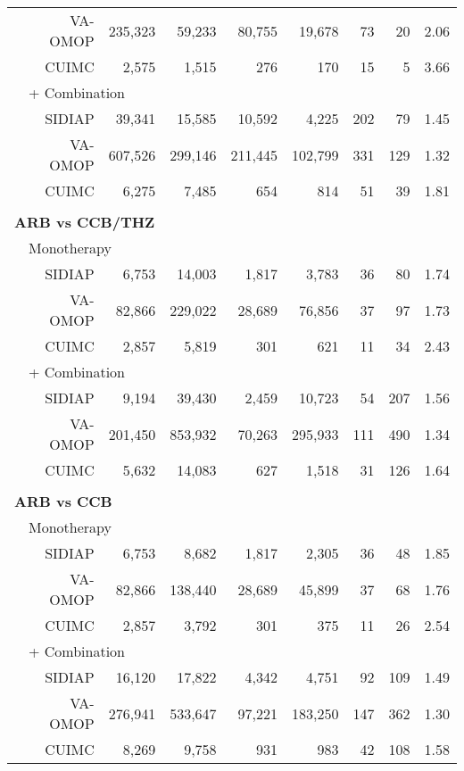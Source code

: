 \documentclass[11pt,]{article}
\begin{document}
\begin{longtable}{p{-2em}p{-2em}rrrrrrrr}
   &  & VA-OMOP & 235,323 & 59,233 & 80,755 & 19,678 & 73 & 20 & 2.06 \\ 
   &  & CUIMC & 2,575 & 1,515 & 276 & 170 & 15 & 5 & 3.66 \\ 
                           & \multicolumn{8}{l}{+ Combination} \\ &  & SIDIAP & 39,341 & 15,585 & 10,592 & 4,225 & 202 & 79 & 1.45 \\ 
   &  & VA-OMOP & 607,526 & 299,146 & 211,445 & 102,799 & 331 & 129 & 1.32 \\ 
   &  & CUIMC & 6,275 & 7,485 & 654 & 814 & 51 & 39 & 1.81 \\ 
   \rowcolor{white} \\ \multicolumn{9}{l}{\textbf{ARB vs CCB/THZ}} \\ & \multicolumn{9}{l}{Monotherapy}  \\ &  & SIDIAP & 6,753 & 14,003 & 1,817 & 3,783 & 36 & 80 & 1.74 \\ 
   &  & VA-OMOP & 82,866 & 229,022 & 28,689 & 76,856 & 37 & 97 & 1.73 \\ 
   &  & CUIMC & 2,857 & 5,819 & 301 & 621 & 11 & 34 & 2.43 \\ 
                           & \multicolumn{8}{l}{+ Combination} \\ &  & SIDIAP & 9,194 & 39,430 & 2,459 & 10,723 & 54 & 207 & 1.56 \\ 
   &  & VA-OMOP & 201,450 & 853,932 & 70,263 & 295,933 & 111 & 490 & 1.34 \\ 
   &  & CUIMC & 5,632 & 14,083 & 627 & 1,518 & 31 & 126 & 1.64 \\ 
   \rowcolor{white} \\ \multicolumn{9}{l}{\textbf{ARB vs CCB}} \\ & \multicolumn{9}{l}{Monotherapy}  \\ &  & SIDIAP & 6,753 & 8,682 & 1,817 & 2,305 & 36 & 48 & 1.85 \\ 
   &  & VA-OMOP & 82,866 & 138,440 & 28,689 & 45,899 & 37 & 68 & 1.76 \\ 
   &  & CUIMC & 2,857 & 3,792 & 301 & 375 & 11 & 26 & 2.54 \\ 
                           & \multicolumn{8}{l}{+ Combination} \\ &  & SIDIAP & 16,120 & 17,822 & 4,342 & 4,751 & 92 & 109 & 1.49 \\ 
   &  & VA-OMOP & 276,941 & 533,647 & 97,221 & 183,250 & 147 & 362 & 1.30 \\ 
   &  & CUIMC & 8,269 & 9,758 & 931 & 983 & 42 & 108 & 1.58 \\ 

\end{longtable}
\end{document}
